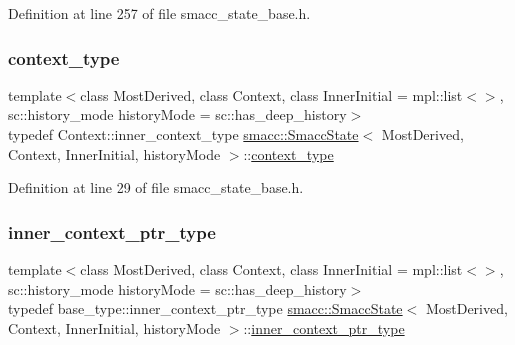 Definition at line 257 of file smacc\+\_\+state\+\_\+base.\+h.

\mbox{\label{classsmacc_1_1SmaccState_a65c128d05dbcadbf817f41ba20b8fa01}} 
\subsubsection{\texorpdfstring{context\+\_\+type}{context\_type}}
{\footnotesize\ttfamily template$<$class Most\+Derived, class Context, class Inner\+Initial = mpl\+::list$<$$>$, sc\+::history\+\_\+mode history\+Mode = sc\+::has\+\_\+deep\+\_\+history$>$ \\
typedef Context\+::inner\+\_\+context\+\_\+type \hyperlink{classsmacc_1_1SmaccState}{smacc\+::\+Smacc\+State}$<$ Most\+Derived, Context, Inner\+Initial, history\+Mode $>$\+::\hyperlink{classsmacc_1_1SmaccState_a65c128d05dbcadbf817f41ba20b8fa01}{context\+\_\+type}}



Definition at line 29 of file smacc\+\_\+state\+\_\+base.\+h.

\mbox{\label{classsmacc_1_1SmaccState_a65a772c2e2039e9a59148ba6ffb54d8a}} 
\subsubsection{\texorpdfstring{inner\+\_\+context\+\_\+ptr\+\_\+type}{inner\_context\_ptr\_type}}
{\footnotesize\ttfamily template$<$class Most\+Derived, class Context, class Inner\+Initial = mpl\+::list$<$$>$, sc\+::history\+\_\+mode history\+Mode = sc\+::has\+\_\+deep\+\_\+history$>$ \\
typedef base\+\_\+type\+::inner\+\_\+context\+\_\+ptr\+\_\+type \hyperlink{classsmacc_1_1SmaccState}{smacc\+::\+Smacc\+State}$<$ Most\+Derived, Context, Inner\+Initial, history\+Mode $>$\+::\hyperlink{classsmacc_1_1SmaccState_a65a772c2e2039e9a59148ba6ffb54d8a}{inner\+\_\+context\+\_\+ptr\+\_\+type}}



